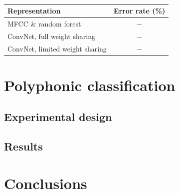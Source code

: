 \documentclass{article}
\begin{document}
\begin{table}
	\begin{center}
	\begin{tabular}{|l|c|}
		\hline
		Representation & Error rate (\%) \\
		\hline
		MFCC \& random forest & $-$ \\
		ConvNet, full weight sharing & $-$ \\
		ConvNet, limited weight sharing & $-$ \\
		\hline
	\end{tabular}
	\end{center}
	\caption{\label{table:single-label-results}}
\end{table}

\section{Polyphonic classification}\label{sec:polyphonic}
\subsection{Experimental design}

\subsection{Results}


\section{Conclusions}


\end{document}
